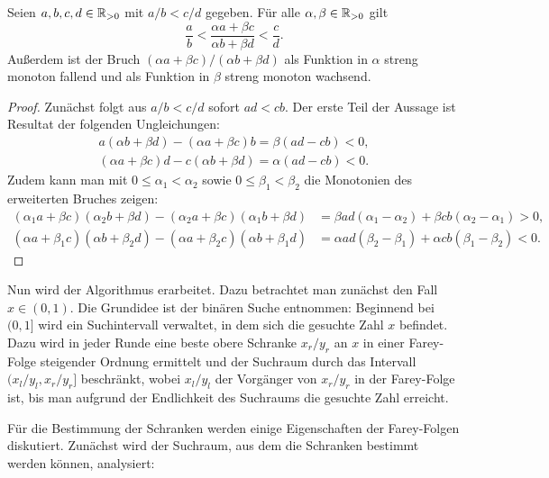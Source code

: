 \begin{lemma}\label{lemma-fraction-helpers}
	Seien $a,b,c,d\in\mathbb{R}_{>0}$ mit $a/b < c/d$ gegeben.
	Für alle $\alpha, \beta \in\mathbb{R}_{>0}$ gilt
	\[
		\frac{a}{b} < \frac{\alpha a + \beta c}{\alpha b + \beta d} < \frac{c}{d}.
	\]
	Außerdem ist der Bruch $(\alpha a + \beta c)/(\alpha b + \beta d)$ als Funktion in $\alpha$ streng monoton fallend und als Funktion in $\beta$ streng monoton wachsend.
\end{lemma}
\begin{proof}
	Zunächst folgt aus $a/b < c/d$ sofort $ad<cb$.
	Der erste Teil der Aussage ist Resultat der folgenden Ungleichungen:
	\begin{align*}
		a(\alpha b + \beta d) - (\alpha a + \beta c)b = \beta(ad - cb) < 0,\\[1em]
		(\alpha a + \beta c)d - c(\alpha b + \beta d) = \alpha(ad - cb) < 0.
	\end{align*}
	Zudem kann man mit $0\leq\alpha_1< \alpha_2$ sowie $0\leq\beta_1< \beta_2$ die Monotonien des erweiterten Bruches zeigen:
	\begin{align*}
		(\alpha_1 a + \beta c)(\alpha_2 b + \beta d) - (\alpha_2a + \beta c)(\alpha_1 b + \beta d) &= \beta a d(\alpha_1 - \alpha_2) + \beta c b (\alpha_2 - \alpha_1) > 0, \\[1em]
		(\alpha a + \beta_1 c)(\alpha b + \beta_2 d) - (\alpha a + \beta_2c)(\alpha b + \beta_1 d) &= \alpha ad(\beta_2 - \beta_1) + \alpha cb(\beta_1 - \beta_2) < 0.
	\end{align*}
\end{proof}

Nun wird der Algorithmus erarbeitet.
Dazu betrachtet man zunächst den Fall $x\in(0,1)$.
Die Grundidee ist der binären Suche entnommen:
Beginnend bei $(0,1]$ wird ein Suchintervall verwaltet, in dem sich die gesuchte Zahl $x$ befindet.
Dazu wird in jeder Runde eine beste obere Schranke $x_r/y_r$ an $x$ in einer Farey-Folge steigender Ordnung ermittelt und der Suchraum durch das Intervall $(x_l/y_l, x_r/y_r]$ beschränkt, wobei $x_l/y_l$ der Vorgänger von $x_r/y_r$ in der Farey-Folge ist, bis man aufgrund der Endlichkeit des Suchraums die gesuchte Zahl erreicht.

Für die Bestimmung der Schranken werden einige Eigenschaften der Farey-Folgen diskutiert.
Zunächst wird der Suchraum, aus dem die Schranken bestimmt werden können, analysiert:

